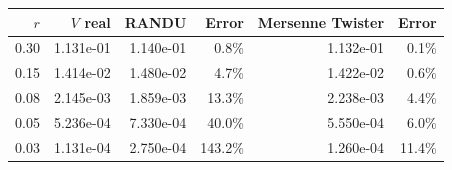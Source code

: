 \begin{tabular}{rrrrrr}
\toprule
$r$ & $V$ real & RANDU & Error & Mersenne Twister & Error \\
\midrule
0.30 & 1.131e-01 & 1.140e-01 & 0.8\% & 1.132e-01 & 0.1\% \\
0.15 & 1.414e-02 & 1.480e-02 & 4.7\% & 1.422e-02 & 0.6\% \\
0.08 & 2.145e-03 & 1.859e-03 & 13.3\% & 2.238e-03 & 4.4\% \\
0.05 & 5.236e-04 & 7.330e-04 & 40.0\% & 5.550e-04 & 6.0\% \\
0.03 & 1.131e-04 & 2.750e-04 & 143.2\% & 1.260e-04 & 11.4\% \\
\bottomrule
\end{tabular}
